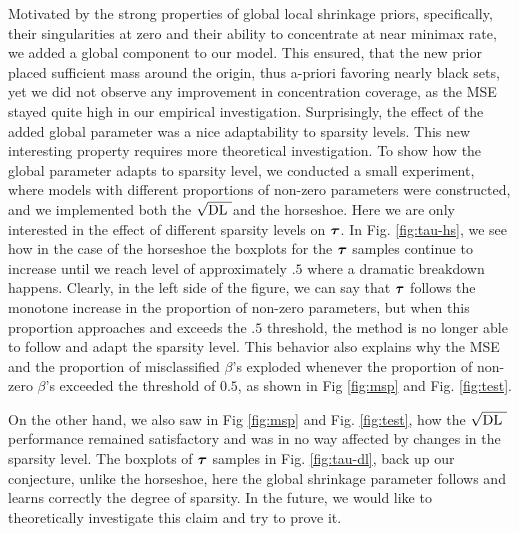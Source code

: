 \documentclass[10pt]{article}
\def\sqdl{$\sqrt{\text{\rm{DL} }}$}
\begin{document}
Motivated by the strong properties of global local shrinkage priors, specifically, their singularities at zero and their ability to concentrate at near minimax rate, we added a global component to our model. This ensured, that the new prior placed sufficient mass around the origin, thus a-priori favoring nearly black sets, yet we did not observe any improvement in concentration coverage, as the MSE stayed quite high in our empirical investigation. Surprisingly, the effect of the added global parameter was a nice adaptability to sparsity levels. This new interesting property requires more theoretical investigation. 
To show how the global parameter adapts to sparsity level, we conducted a small experiment, where models with different proportions of non-zero parameters were constructed, and we implemented both the \sqdl and the horseshoe. Here we are only interested in the effect of different sparsity levels on $\boldsymbol{\tau}$. In Fig. \ref{fig:tau-hs}, we see how in the case of the horseshoe the boxplots for the $\boldsymbol{\tau}$ samples continue to increase until we reach  level of approximately $.5$ where a dramatic breakdown happens. Clearly, in the left side of the figure, we can say that $\boldsymbol{\tau}$ follows the monotone increase in the proportion of non-zero parameters, but when this proportion approaches and exceeds the $.5$ threshold, the method is no longer able to follow and adapt the sparsity level. This behavior also explains why the MSE and the proportion of misclassified $\beta$'s exploded whenever the proportion of non-zero $\beta$'s exceeded the threshold of $0.5$, as shown in Fig \ref{fig:msp} and Fig. \ref{fig:test}.


On the other hand, we also saw in Fig \ref{fig:msp} and Fig. \ref{fig:test}, how the \sqdl performance remained satisfactory and was in no way affected by changes in the sparsity level. The boxplots of $\boldsymbol{\tau}$ samples in Fig. \ref{fig:tau-dl}, back up our conjecture, unlike the horseshoe, here the global shrinkage parameter follows and learns correctly the degree of sparsity. In the future, we would like to theoretically investigate this claim and try to prove it.
\end{document}
